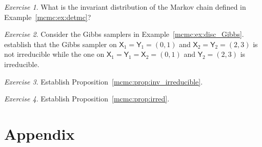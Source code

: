 \documentclass[12pt]{article}
\theoremstyle{plain}
\theoremstyle{definition}
\theoremstyle{remark}
\newtheorem{hw}{Exercise}[section]
\newcommand{\X}{\mathsf{X}}
\newcommand{\Y}{\mathsf{Y}}
\begin{document}
\begin{hw}
What is the invariant distribution of the Markov chain defined in
Example~\ref{mcmc:ex:detmc}?
\end{hw}

\begin{hw}
  Consider the Gibbs samplers in Example~\ref{mcmc:ex:disc_Gibbs}.
  establish that the Gibbs sampler on $\X_1 = \Y_1 = (0,1)$ and
  $\X_2 = \Y_2 = (2,3)$ is not irreducible while the one on
  $\X_1 = \Y_1 = \X_2 = (0,1)$ and $ \Y_2 = (2,3)$ is irreducible.
\end{hw}

\begin{hw}
Establish Proposition~\ref{mcmc:prop:inv_irreducible}.
\end{hw}

\begin{hw}
  Establish Proposition~\ref{mcmc:prop:irred}.
\end{hw}




\newpage

\section*{Appendix}





\end{document}
